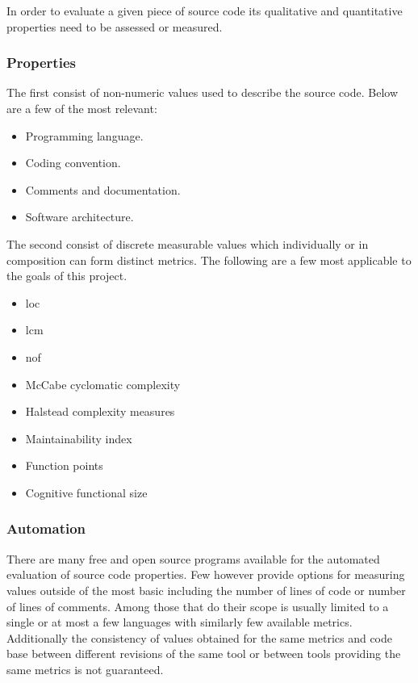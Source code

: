 In order to evaluate a given piece of source code its qualitative and quantitative properties need to be assessed or measured.

\subsubsection{Properties}

The first consist of non-numeric values used to describe the source code. Below are a few of the most relevant:

\begin{itemize}
    \item Programming language.
    \item Coding convention.
    \item Comments and documentation.
    \item Software architecture.
\end{itemize}

The second consist of discrete measurable values which individually or in composition can form distinct metrics. The following are a few most applicable to the goals of this project.

\begin{itemize}
    \item \gls{loc} \cite{loc}
    \item \gls{lcm} \cite{lcm-1,lcm-2}
    \item \gls{nof} \cite{nof}
    \item McCabe cyclomatic complexity \cite{mccabe-complexity}
    \item Halstead complexity measures \cite{halstead-complexity}
    \item Maintainability index \cite{maintainability-1,maintainability-2}
    \item Function points \cite{functional-size}
    \item Cognitive functional size \cite{cognitive-complexity}
\end{itemize}

\subsubsection{Automation}

There are many free and open source programs available for the automated evaluation of source code properties. Few however provide options for measuring values outside of the most basic including the number of lines of code or number of lines of comments. Among those that do their scope is usually limited to a single or at most a few languages with similarly few available metrics. Additionally the consistency of values obtained for the same metrics and code base between different revisions of the same tool or between tools providing the same metrics is not guaranteed.

